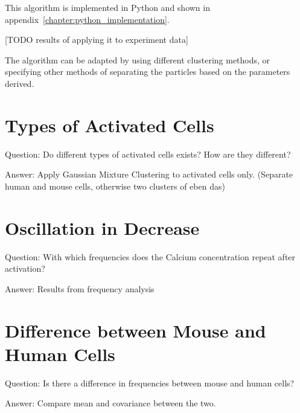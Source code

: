 This algorithm is implemented in Python and shown in appendix~\ref{chapter:python_implementation}.

[TODO results of applying it to experiment data]

The algorithm can be adapted by using different clustering methods, or specifying other methods of separating the particles based on the parameters derived.


\section{Types of Activated Cells}

Question: Do different types of activated cells exists? How are they different?

Answer: Apply Gaussian Mixture Clustering to activated cells only. (Separate human and mouse cells, otherwise two clusters of eben das)

\section{Oscillation in Decrease}

Question: With which frequencies does the Calcium concentration repeat after activation?

Answer: Results from frequency analysis

\section{Difference between Mouse and Human Cells}

Question: Is there a difference in frequencies between mouse and human cells?

Answer: Compare mean and covariance between the two.